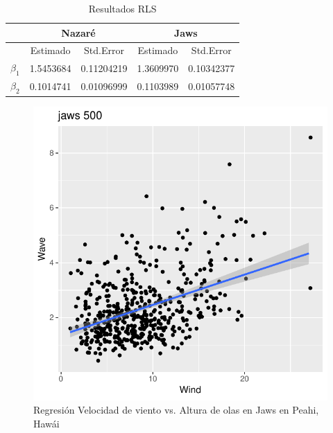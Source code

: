 \begin{table}[htbp]
    \centering
    \begin{tabular}{lcc|cc}
        \toprule
        & \multicolumn{2}{c}{Nazaré} & \multicolumn{2}{c}{Jaws} \\
        \midrule
        & Estimado & Std.Error & Estimado & Std.Error \\
        \midrule
        \(\beta_1\)     & 1.5453684 & 0.11204219  &  1.3609970 & 0.10342377  \\
        \(\beta_2\)     & 0.1014741 & 0.01096999  &  0.1103989 & 0.01057748 \\
        \bottomrule
    \end{tabular}
    \caption{Resultados RLS}
    \label{tab:results_RLS}
\end{table}

%     
%     
%     


\begin{figure}[H]
    \centering
    \includegraphics{./figures/jaws_500_lmFit.pdf}
    \caption{Regresión Velocidad de viento vs. Altura de olas en Jaws en Peahi, Hawái}
    \label{fig:wind_waves_jaws_fit}
\end{figure}

